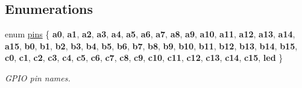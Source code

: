 \subsection*{Enumerations}
\begin{DoxyCompactItemize}
\item 
\mbox{\label{namespacestm32f030x6_aec819db41bff19f45418c0d22e5ccecf}} 
enum \hyperlink{namespacestm32f030x6_aec819db41bff19f45418c0d22e5ccecf}{pins} \{ \newline
{\bfseries a0}, 
{\bfseries a1}, 
{\bfseries a2}, 
{\bfseries a3}, 
\newline
{\bfseries a4}, 
{\bfseries a5}, 
{\bfseries a6}, 
{\bfseries a7}, 
\newline
{\bfseries a8}, 
{\bfseries a9}, 
{\bfseries a10}, 
{\bfseries a11}, 
\newline
{\bfseries a12}, 
{\bfseries a13}, 
{\bfseries a14}, 
{\bfseries a15}, 
\newline
{\bfseries b0}, 
{\bfseries b1}, 
{\bfseries b2}, 
{\bfseries b3}, 
\newline
{\bfseries b4}, 
{\bfseries b5}, 
{\bfseries b6}, 
{\bfseries b7}, 
\newline
{\bfseries b8}, 
{\bfseries b9}, 
{\bfseries b10}, 
{\bfseries b11}, 
\newline
{\bfseries b12}, 
{\bfseries b13}, 
{\bfseries b14}, 
{\bfseries b15}, 
\newline
{\bfseries c0}, 
{\bfseries c1}, 
{\bfseries c2}, 
{\bfseries c3}, 
\newline
{\bfseries c4}, 
{\bfseries c5}, 
{\bfseries c6}, 
{\bfseries c7}, 
\newline
{\bfseries c8}, 
{\bfseries c9}, 
{\bfseries c10}, 
{\bfseries c11}, 
\newline
{\bfseries c12}, 
{\bfseries c13}, 
{\bfseries c14}, 
{\bfseries c15}, 
\newline
{\bfseries led}
 \}\begin{DoxyCompactList}\small\item\em G\+P\+IO pin names. \end{DoxyCompactList}
\end{DoxyCompactItemize}
